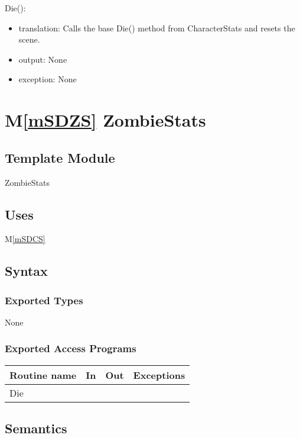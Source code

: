 \documentclass[12pt]{article}
\newcommand{\mref}[1]{M\ref{#1}}
\begin{document}
\noindent Die():
\begin{itemize}
\item translation: Calls the base Die() method from CharacterStats and resets the scene.
\item output: None
\item exception: None
\end{itemize}

\newpage

\section* {\mref{mSDZS} ZombieStats}

\subsection*{Template Module}

ZombieStats

\subsection* {Uses}

\mref{mSDCS}

\subsection* {Syntax}

\subsubsection* {Exported Types}

None

\subsubsection* {Exported Access Programs}

\begin{tabular}{| l | l | l | l |}
\hline
\textbf{Routine name} & \textbf{In} & \textbf{Out} & \textbf{Exceptions}\\
\hline
Die & ~  & ~ & ~\\
\hline
\end{tabular}

\subsection* {Semantics}
\end{document}
